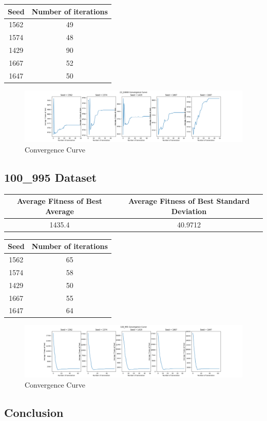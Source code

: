 \documentclass{article}
\begin{document}
\begin{center}
	\begin{tabular}{|c|c|}
		\hline
		Seed & Number of iterations \\
		\hline
		1562 & 49 \\
		\hline
		1574 & 48 \\
		\hline
		1429 & 90 \\
		\hline
		1667 & 52 \\
		\hline
		1647 & 50 \\
		\hline
	\end{tabular}
\end{center}

\begin{figure}[h!]
	\centering
	\includegraphics[width=\linewidth]{knapsack_23_10000.png}
	\caption{Convergence Curve}
\end{figure}

\subsection*{100\_995 Dataset}
\begin{center}
	\begin{tabular}{|c|c|}
		\hline
		Average Fitness of Best Average & Average Fitness of Best Standard Deviation \\
		\hline
		1435.4 & 40.9712 \\
		\hline
	\end{tabular}
\end{center}

\begin{center}
	\begin{tabular}{|c|c|}
		\hline
		Seed & Number of iterations \\
		\hline
		1562 & 65 \\
		\hline
		1574 & 58 \\
		\hline
		1429 & 50 \\
		\hline
		1667 & 55 \\
		\hline
		1647 & 64 \\
		\hline
	\end{tabular}
\end{center}

\begin{figure}[h!]
	\centering
	\includegraphics[width=\linewidth]{knapsack_100_995.png}
	\caption{Convergence Curve}
\end{figure}

\subsection*{Conclusion}



\end{document}
